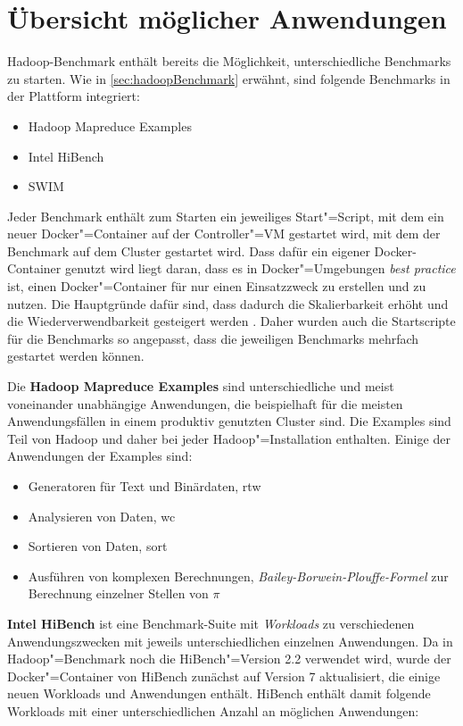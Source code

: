 \section{Übersicht möglicher Anwendungen}\label{sec:appOverview}

Hadoop-Benchmark enthält bereits die Möglichkeit, unterschiedliche Benchmarks zu starten. Wie in \autoref{sec:hadoopBenchmark} erwähnt, sind folgende Benchmarks in der Plattform integriert:

\begin{itemize}
    \item Hadoop Mapreduce Examples
    \item Intel HiBench
    \item \ac{SWIM}
\end{itemize}

Jeder Benchmark enthält zum Starten ein jeweiliges Start"=Script, mit dem ein neuer Docker"=Container auf der Controller"=VM gestartet wird, mit dem der Benchmark auf dem Cluster gestartet wird. Dass dafür ein eigener Docker-Container genutzt wird liegt daran, dass es in Docker"=Umgebungen \emph{best practice} ist, einen Docker"=Container für nur einen Einsatzzweck zu erstellen und zu nutzen. Die Hauptgründe dafür sind, dass dadurch die Skalierbarkeit erhöht und die Wiederverwendbarkeit gesteigert werden \cite{DockerBestPractice}. Daher wurden auch die Startscripte für die Benchmarks so angepasst, dass die jeweiligen Benchmarks mehrfach gestartet werden können.

Die \textbf{Hadoop Mapreduce Examples} sind unterschiedliche und meist voneinander unabhängige Anwendungen, die beispielhaft für die meisten Anwendungsfällen in einem produktiv genutzten Cluster sind. Die Examples sind Teil von Hadoop und daher bei jeder Hadoop"=Installation enthalten. Einige der Anwendungen der Examples sind:

\begin{itemize}
    \item Generatoren für Text und Binärdaten, \zB \acl{rtw}
    \item Analysieren von Daten, \zB \acl{wc}
    \item Sortieren von Daten, \zB \acl{sort}
    \item Ausführen von komplexen Berechnungen, \zB \emph{Bailey-Borwein-Plouffe-Formel} zur Berechnung einzelner Stellen von $\pi$
\end{itemize}

\textbf{Intel HiBench} ist eine Benchmark-Suite mit \emph{Workloads} zu verschiedenen Anwendungszwecken mit jeweils unterschiedlichen einzelnen Anwendungen. Da in Hadoop"=Benchmark noch die HiBench"=Version \mbox{2.2} verwendet wird, wurde der Docker"=Container von HiBench zunächst auf Version 7 aktualisiert, die einige neuen Workloads und Anwendungen enthält. HiBench enthält damit folgende Workloads mit einer unterschiedlichen Anzahl an möglichen Anwendungen:

